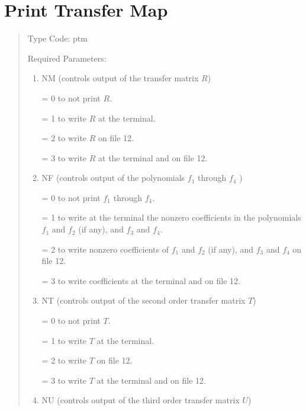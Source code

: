 \section{Print Transfer Map}
\begin{quotation}
\noindent Type Code:  ptm    
\vspace{5mm}

\noindent Required Parameters:
\begin{enumerate}
      \item  NM (controls output of the transfer matrix $R$)

             = 0 to not print $R$.

             = 1 to write $R$ at the terminal.

             = 2 to write $R$ on file 12.

             = 3 to write $R$ at the terminal and on file 12.

      \item  NF (controls output of the polynomials $f_1$ through $f_4$ )

             = 0 to not print $f_1$ through $f_4$.

             = 1 to write at the terminal the nonzero coefficients in the
               polynomials \linebreak \hspace*{1em} $f_1$ and $f_2$ (if
any), and $f_3$ and $f_4$.

             = 2 to write nonzero coefficients of $f_1$ and $f_2$ (if
any), and $f_3$ and $f_4$ on file \linebreak \hspace*{1em} 12.

             = 3 to write coefficients at the terminal and on file 12.

      \item  NT  (controls output of the second order transfer matrix $T$) 

             = 0 to not print $T$.

             = 1 to write $T$ at the terminal.

             = 2 to write $T$ on file 12.

             = 3 to write $T$ at the terminal and on file 12.

      \item  NU (controls output of the third order transfer matrix $U$) 


\end{enumerate}
\end{quotation}
